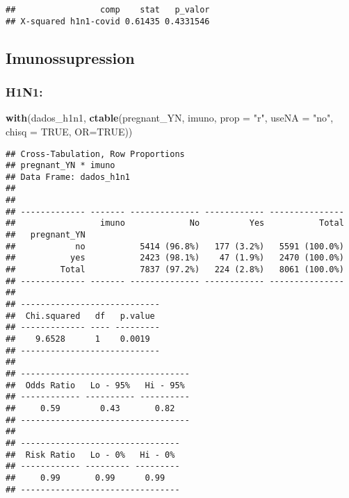 \documentclass[
]{article}
\newenvironment{Shaded}{\begin{snugshade}}{\end{snugshade}}
\newcommand{\DataTypeTok}[1]{\textcolor[rgb]{0.13,0.29,0.53}{#1}}
\newcommand{\KeywordTok}[1]{\textcolor[rgb]{0.13,0.29,0.53}{\textbf{#1}}}
\newcommand{\NormalTok}[1]{#1}
\newcommand{\OtherTok}[1]{\textcolor[rgb]{0.56,0.35,0.01}{#1}}
\newcommand{\StringTok}[1]{\textcolor[rgb]{0.31,0.60,0.02}{#1}}
\begin{document}
\begin{verbatim}
##                 comp    stat   p_valor
## X-squared h1n1-covid 0.61435 0.4331546
\end{verbatim}

\hypertarget{imunossupression}{%
\subsection{Imunossupression}\label{imunossupression}}

\hypertarget{h1n1-8}{%
\subsubsection{H1N1:}\label{h1n1-8}}

\begin{Shaded}
\begin{Highlighting}[]
\KeywordTok{with}\NormalTok{(dados_h1n1, }\KeywordTok{ctable}\NormalTok{(pregnant_YN, imuno, }\DataTypeTok{prop =} \StringTok{"r"}\NormalTok{, }\DataTypeTok{useNA =} \StringTok{"no"}\NormalTok{, }\DataTypeTok{chisq =} \OtherTok{TRUE}\NormalTok{, }\DataTypeTok{OR=}\OtherTok{TRUE}\NormalTok{))}
\end{Highlighting}
\end{Shaded}

\begin{verbatim}
## Cross-Tabulation, Row Proportions  
## pregnant_YN * imuno  
## Data Frame: dados_h1n1  
## 
## 
## ------------- ------- -------------- ------------ ---------------
##                 imuno             No          Yes           Total
##   pregnant_YN                                                    
##            no           5414 (96.8%)   177 (3.2%)   5591 (100.0%)
##           yes           2423 (98.1%)    47 (1.9%)   2470 (100.0%)
##         Total           7837 (97.2%)   224 (2.8%)   8061 (100.0%)
## ------------- ------- -------------- ------------ ---------------
## 
## ----------------------------
##  Chi.squared   df   p.value 
## ------------- ---- ---------
##    9.6528      1    0.0019  
## ----------------------------
## 
## ----------------------------------
##  Odds Ratio   Lo - 95%   Hi - 95% 
## ------------ ---------- ----------
##     0.59        0.43       0.82   
## ----------------------------------
## 
## --------------------------------
##  Risk Ratio   Lo - 0%   Hi - 0% 
## ------------ --------- ---------
##     0.99       0.99      0.99   
## --------------------------------
\end{verbatim}
\end{document}
